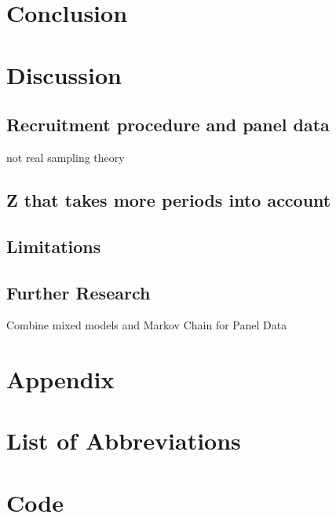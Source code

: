 \documentclass[12pt,a4paper,oneside]{book}
\begin{document}
\chapter{Conclusion}


\chapter{Discussion}

\section*{Recruitment procedure and panel data}
not real sampling theory



\section*{Z that takes more periods into account}



\section*{Limitations}


\section*{Further Research}

Combine mixed models and Markov Chain for Panel Data \citep{de_haan-rietdijk_use_2017} 


\nocite{*}



\newpage

\chapter*{Appendix}




\chapter*{List of Abbreviations}
  

\begin{appendix}
  \listoffigures
  \listoftables
\end{appendix}

\chapter*{Code}
\end{document}
